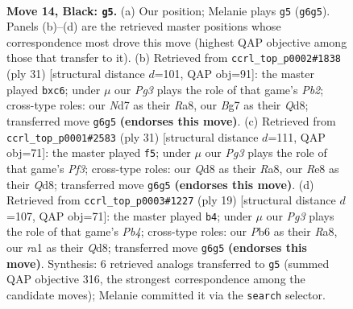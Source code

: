 \documentclass[11pt]{article}
\begin{document}
\clearpage

\begin{figure}[p]\centering
\begin{subfigure}{0.46\textwidth}\centering
\resizebox{\linewidth}{!}{%
\newchessgame
\chessboard[
  setfen={rn1qr1k1/p2n1pb1/1p1p2pp/2pP3P/P3PPP1/2N5/1P2N3/R1BQK2R b KQ - 0 14},
  showmover=false,
  pgfstyle=straightmove, color=movearrow, markmove={g6-g5}
]}
\caption{}
\end{subfigure}\hfill
\begin{subfigure}{0.46\textwidth}\centering
\resizebox{\linewidth}{!}{%
\newchessgame
\chessboard[
  setfen={r2q2k1/1p3pp1/1bPprnnp/p3p3/P2PP3/2P2N2/2QN1PPP/R1B1R1K1 b - - 0 16},
  showmover=false,
  pgfstyle=straightmove, color=movearrow, markmove={b7-c6}
]}
\caption{}
\end{subfigure}
\\[4pt]
\begin{subfigure}{0.46\textwidth}\centering
\resizebox{\linewidth}{!}{%
\newchessgame
\chessboard[
  setfen={r2qkbr1/pp4p1/1nn1ppNp/4P2P/3PpP2/8/PP2N1P1/R1BQ1RK1 b q - 5 16},
  showmover=false,
  pgfstyle=straightmove, color=movearrow, markmove={f6-f5}
]}
\caption{}
\end{subfigure}\hfill
\begin{subfigure}{0.46\textwidth}\centering
\resizebox{\linewidth}{!}{%
\newchessgame
\chessboard[
  setfen={rn1qkb1r/5pp1/p2pbn2/1p2p2p/P3P3/2N3PP/1PP1NPB1/R1BQK2R b KQkq - 0 10},
  showmover=false,
  pgfstyle=straightmove, color=movearrow, markmove={b5-b4}
]}
\caption{}
\end{subfigure}
\caption{\textbf{Move 14, Black: \texttt{g5}.} (a) Our position; Melanie plays \texttt{g5} (\texttt{g6g5}). Panels (b)--(d) are the retrieved master positions whose correspondence most drove this move (highest QAP objective among those that transfer to it). (b) Retrieved from \texttt{ccrl\_top\_p0002\#1838} (ply 31) [structural distance $d$=101, QAP obj=91]: the master played \texttt{bxc6}; under $\mu$ our \emph{Pg3} plays the role of that game's \emph{Pb2}; cross-type roles: our \emph{N}d7 as their \emph{R}a8, our \emph{B}g7 as their \emph{Q}d8; transferred move \texttt{g6g5} \textbf{(endorses this move)}. (c) Retrieved from \texttt{ccrl\_top\_p0001\#2583} (ply 31) [structural distance $d$=111, QAP obj=71]: the master played \texttt{f5}; under $\mu$ our \emph{Pg3} plays the role of that game's \emph{Pf3}; cross-type roles: our \emph{Q}d8 as their \emph{R}a8, our \emph{R}e8 as their \emph{Q}d8; transferred move \texttt{g6g5} \textbf{(endorses this move)}. (d) Retrieved from \texttt{ccrl\_top\_p0003\#1227} (ply 19) [structural distance $d$=107, QAP obj=71]: the master played \texttt{b4}; under $\mu$ our \emph{Pg3} plays the role of that game's \emph{Pb4}; cross-type roles: our \emph{P}b6 as their \emph{R}a8, our \emph{r}a1 as their \emph{Q}d8; transferred move \texttt{g6g5} \textbf{(endorses this move)}. Synthesis: 6 retrieved analogs transferred to \texttt{g5} (summed QAP objective 316, the strongest correspondence among the candidate moves); Melanie committed it via the \texttt{search} selector.}
\label{fig:thought-m27}
\end{figure}
\end{document}
